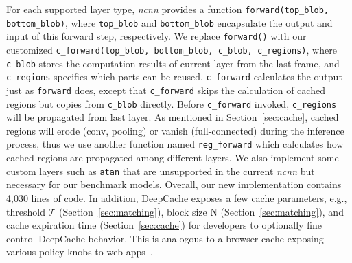 \documentclass[10pt,acmtog]{acmart}
\newcommand{\framework}{DeepCache\xspace}
\newcommand{\sys}{\framework{}}
\begin{document}
For each supported layer type, \emph{ncnn} provides a function \texttt{forward(top\_blob, bottom\_blob)}, where \texttt{top\_blob} and \texttt{bottom\_blob} encapsulate the output and input of this forward step, respectively.
We replace \texttt{forward()} with our customized \texttt{c\_forward(top\_blob, bottom\_blob, c\_blob, c\_regions)}, where \texttt{c\_blob} stores the computation results of current layer from the last frame, and \texttt{c\_regions} specifies which parts can be reused.
\texttt{c\_forward} calculates the output just as \texttt{forward} does, except that \texttt{c\_forward} skips the calculation of cached regions but copies from \texttt{c\_blob} directly.
Before \texttt{c\_forward} invoked, \texttt{c\_regions} will be propagated from last layer.
As mentioned in Section~\ref{sec:cache}, cached regions will erode (conv, pooling) or vanish  (full-connected) during the inference process, thus we use another function named \texttt{reg\_forward} which calculates how cached regions are propagated among different layers.
We also implement some custom layers such as \texttt{atan} that are unsupported in the current \emph{ncnn} but necessary for our benchmark models. 
Overall, our new implementation contains 4,030 lines of code. 
In addition, \sys{} exposes a few cache parameters, e.g., threshold $\mathcal{T}$ (Section~\ref{sec:matching}), block size N (Section~\ref{sec:matching}), and cache expiration time (Section~\ref{sec:cache}) for developers to optionally fine control \framework behavior.
This is analogous to a browser cache exposing various policy knobs to web apps~\cite{webcache}.
\end{document}
